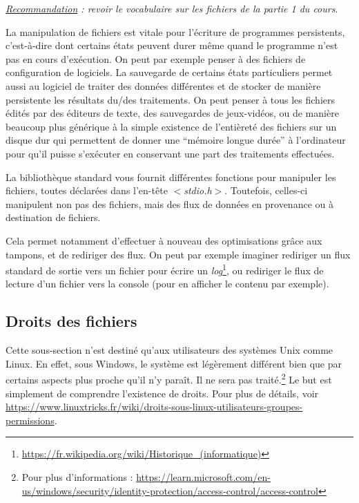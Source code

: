 \documentclass[../../../main.tex]{subfiles}
\begin{document}
\textit{\underline{Recommandation} : revoir le vocabulaire sur les fichiers de la partie 1 du cours}.
 
La manipulation de fichiers est vitale pour l'écriture de programmes persistents, c'est-à-dire dont certains états peuvent durer même quand le programme n'est pas en cours d'exécution. On peut par exemple penser à des fichiers de configuration de logiciels. La sauvegarde de certains états particuliers permet aussi au logiciel de traiter des données différentes et de stocker de manière persistente les résultats du/des traitements. On peut penser à tous les fichiers édités par des éditeurs de texte, des sauvegardes de jeux-vidéos, ou de manière beaucoup plus générique à la simple existence de l'entièreté des fichiers sur un disque dur qui permettent de donner une ``mémoire longue durée'' à l'ordinateur pour qu'il puisse s'exécuter en conservant une part des traitements effectuées.
 
La bibliothèque standard vous fournit différentes fonctions pour manipuler les fichiers, toutes déclarées dans l’en-tête \textit{$<$stdio.h$>$}. Toutefois, celles-ci manipulent non pas des fichiers, mais des flux de données en provenance ou à destination de fichiers.
 
Cela permet notamment d'effectuer à nouveau des optimisations grâce aux tampons, et de rediriger des flux. On peut par exemple imaginer rediriger un flux standard de sortie vers un fichier pour écrire un \textit{log}\footnote{\url{https://fr.wikipedia.org/wiki/Historique_(informatique)}}, ou rediriger le flux de lecture d'un fichier vers la console (pour en afficher le contenu par exemple).
\subsection{Droits des fichiers}
\label{sub:droits_des_fichiers}
Cette sous-section n'est destiné qu'aux utilisateurs des systèmes Unix comme Linux. En effet, sous Windows, le système est légèrement différent bien que par certains aspects plus proche qu'il n'y paraît. Il ne sera pas traité.\footnote{Pour plus d'informations : \url{https://learn.microsoft.com/en-us/windows/security/identity-protection/access-control/access-control}} Le but est simplement de comprendre l'existence de droits. Pour plus de détails, voir \url{https://www.linuxtricks.fr/wiki/droits-sous-linux-utilisateurs-groupes-permissions}.
 
\end{document}

